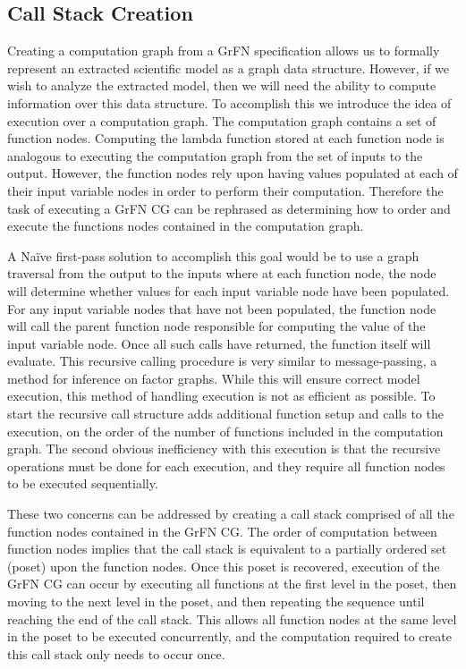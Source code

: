 \subsection{Call Stack Creation\label{sec:call_stack}}
Creating a computation graph from a GrFN specification allows us to formally represent an extracted scientific model as a graph data structure.
However, if we wish to analyze the extracted model, then we will need the ability to compute information over this data structure.
To accomplish this we introduce the idea of execution over a computation graph. The computation graph contains a set of function nodes.
Computing the lambda function stored at each function node is analogous to executing the computation graph from the set of inputs to the output.
However, the function nodes rely upon having values populated at each of their input variable nodes in order to perform their computation.
Therefore the task of executing a GrFN CG can be rephrased as determining how to order and execute the functions nodes contained in the computation graph.

A Naïve first-pass solution to accomplish this goal would be to use a graph traversal from the output to the inputs where at each function node, the node will determine whether values for each input variable node have been populated.
For any input variable nodes that have not been populated, the function node will call the parent function node responsible for computing the value of the input variable node.
Once all such calls have returned, the function itself will evaluate. This recursive calling procedure is very similar to message-passing, a method for inference on factor graphs.
While this will ensure correct model execution, this method of handling execution is not as efficient as possible.
To start the recursive call structure adds additional function setup and calls to the execution, on the order of the number of functions included in the computation graph.
The second obvious inefficiency with this execution is that the recursive operations must be done for each execution, and they require all function nodes to be executed sequentially.

These two concerns can be addressed by creating a call stack comprised of all the function nodes contained in the GrFN CG.
The order of computation between function nodes implies that the call stack is equivalent to a partially ordered set (poset) upon the function nodes.
Once this poset is recovered, execution of the GrFN CG can occur by executing all functions at the first level in the poset, then moving to the next level in the poset, and then repeating the sequence until reaching the end of the call stack.
This allows all function nodes at the same level in the poset to be executed concurrently, and the computation required to create this call stack only needs to occur once.

